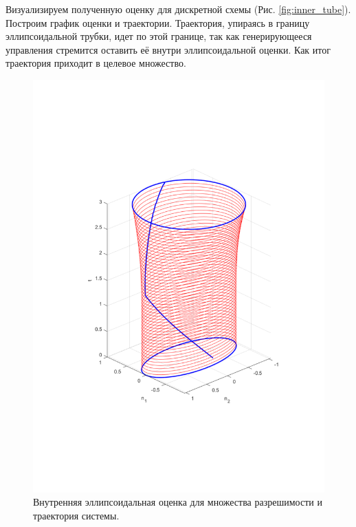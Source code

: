 Визуализируем полученную оценку для дискретной схемы (Рис. \eqref{fig:inner_tube}). 
Построим график оценки и траектории. Траектория, упираясь в границу эллипсоидальной трубки,
 идет по этой границе, так как генерирующееся управления стремится оставить её внутри
 эллипсоидальной оценки. Как итог траектория приходит в целевое множество.

\begin{figure}[ht]
	\centering
	\includegraphics[width = 0.9\linewidth]{"./resources/solv_tube.pdf"}
	\caption{Внутренняя эллипсоидальная оценка для множества разрешимости и траектория системы.}
    \label{fig:inner_tube}
\end{figure}

